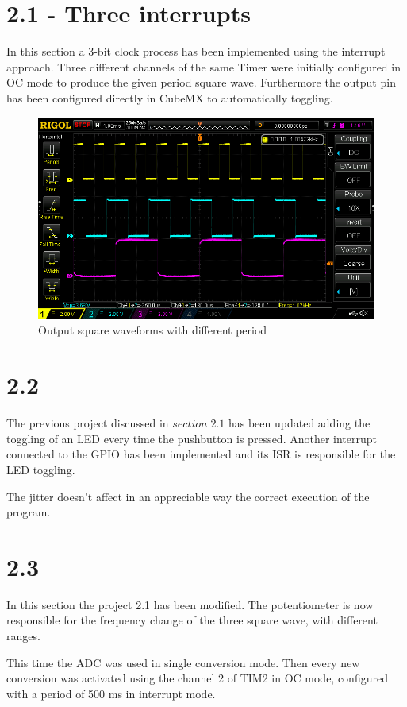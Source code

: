 \documentclass[12pt]{article}
\begin{document}
\section*{2.1 - Three interrupts}
In this section a 3-bit clock process has been implemented using the interrupt approach. Three different channels of the same Timer were initially configured in OC mode to produce the given period square wave.
Furthermore the output pin has been configured directly in CubeMX to automatically toggling. 
\begin{figure}[h!]
	\centering
	\includegraphics[scale = 0.38]{immagini/DS1Z_QuickPrint13.png}
	\caption{Output square waveforms with different period}
\end{figure}



\section*{2.2 }

The previous project discussed in $section\; 2.1$
has been updated adding the toggling of an LED every time the pushbutton is pressed. 
Another interrupt connected to the GPIO has been implemented and its ISR is responsible for the LED toggling.

The jitter doesn't affect in an appreciable way the correct execution of the program.
\section*{2.3 }

In this section the project 2.1 has been modified. The potentiometer is now responsible for the frequency change of the three square wave, with different ranges.

This time the ADC was used in single conversion mode. Then every new conversion was activated using the channel 2 of TIM2 in OC mode, configured with a period of 500 ms in interrupt mode. 
\end{document}
